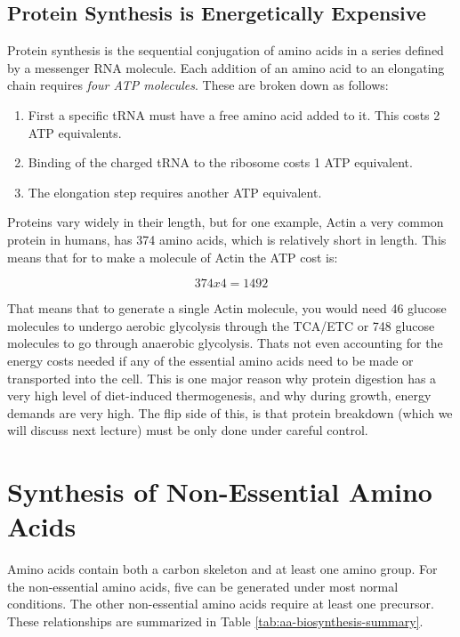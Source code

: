 \documentclass{tufte-handout}
\begin{document}
\subsection{Protein Synthesis is Energetically Expensive}

Protein synthesis is the sequential conjugation of amino acids in a series defined by a messenger RNA molecule.  Each addition of an amino acid to an elongating chain requires \emph{four ATP molecules}.  These are broken down as follows:

\begin{enumerate}
\item First a specific tRNA must have a free amino acid added to it.  This costs 2 ATP equivalents.
\item Binding of the charged tRNA to the ribosome costs 1 ATP equivalent.
\item The elongation step requires another ATP equivalent.
\end{enumerate}

Proteins vary widely in their length, but for one example, Actin a very common protein in humans, has 374 amino acids, which is relatively short in length.  This means that for to make a molecule of Actin the ATP cost is:

\begin{equation}
374 x 4 = 1492 
\end{equation}

That means that to generate a single Actin molecule, you would need 46 glucose molecules to undergo aerobic glycolysis through the TCA/ETC or 748 glucose molecules to go through anaerobic glycolysis. Thats not even accounting for the energy costs needed if any of the essential amino acids need to be made or transported into the cell.  This is one major reason why protein digestion has a very high level of diet-induced thermogenesis, and why during growth, energy demands are very high.  The flip side of this, is that protein breakdown (which we will discuss next lecture) must be only done under careful control.

\section{Synthesis of Non-Essential Amino Acids}

Amino acids contain both a carbon skeleton and at least one amino group.  For the non-essential amino acids, five can be generated under most normal conditions.  The other non-essential amino acids require at least one precursor.  These relationships are summarized in Table \ref{tab:aa-biosynthesis-summary}.
\end{document}
